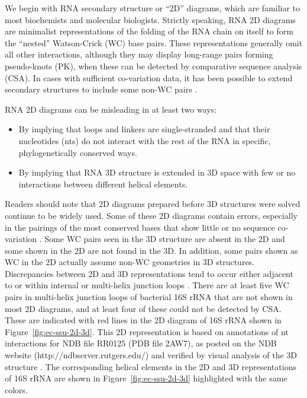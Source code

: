 We begin with RNA secondary structure or ``2D'' diagrams, which are familiar to
most biochemists and molecular biologists. Strictly speaking, RNA 2D diagrams
are minimalist representations of the folding of the RNA chain on itself to form
the ``nested'' Watson-Crick (WC) base pairs. These representations generally omit
all other interactions, although they may display long-range pairs forming
pseudo-knots (PK), when these can be detected by comparative sequence analysis
(CSA). In cases with sufficient co-variation data, it has been possible to
extend secondary structures to include some non-WC pairs \cite{Gutell1994}. 

RNA 2D diagrams can be misleading in at least two ways: 
\begin{itemize}
  \item By implying that loops and linkers are single-stranded and that their
    nucleotides (nts) do not interact with the rest of the RNA in specific,
    phylogenetically conserved ways.

  \item By implying that RNA 3D structure is extended in 3D space with few or no
    interactions between different helical elements. 
\end{itemize}

Readers should note that 2D diagrams prepared before 3D structures were solved
continue to be widely used. Some of these 2D diagrams contain errors, especially
in the pairings of the most conserved bases that show little or no sequence
co-variation \cite{Petrov2013a}. Some WC pairs seen in the 3D structure are
absent in the 2D and some shown in the 2D are not found in the 3D. In addition,
some pairs shown as WC in the 2D actually assume non-WC geometries in 3D
structures. Discrepancies between 2D and 3D representations tend to occur either
adjacent to or within internal or multi-helix junction loops \cite{Petrov2013}.
There are at least five WC pairs in multi-helix junction loops of bacterial 16S
rRNA that are not shown in most 2D diagrams, and at least four of these could
not be detected by CSA. These are indicated with red lines in the 2D diagram of
\EC{} 16S rRNA shown in Figure~\ref{fig:ec-ssu-2d-3d}. This 2D representation is based on
annotations of nt interactions for NDB file RR0125 (PDB file 2AW7), as posted on
the NDB website (http://ndbserver.rutgers.edu/) and verified by visual analysis
of the 3D structure \cite{CoimbatoreNarayanan2014}. The corresponding helical elements in the 2D and 3D
representations of 16S rRNA are shown in Figure~\ref{fig:ec-ssu-2d-3d} highlighted with the same
colors. 

